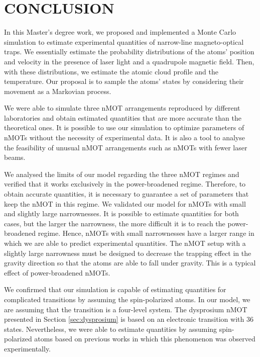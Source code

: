 %
\chapter{CONCLUSION}
\label{ch:conclusion}
%

In this Master's degree work, we proposed and implemented a Monte Carlo simulation to estimate experimental quantities of narrow-line magneto-optical traps. We essentially estimate the probability distributions of the atoms' position and velocity in the presence of laser light and a quadrupole magnetic field. Then, with these distributions, we estimate the atomic cloud profile and the temperature. Our proposal is to sample the atoms' states by considering their movement as a Markovian process.

We were able to simulate three nMOT arrangements reproduced by different laboratories and obtain estimated quantities that are more accurate than the theoretical ones. It is possible to use our simulation to optimize parameters of nMOTs without the necessity of experimental data. It is also a tool to analyse the feasibility of unusual nMOT arrangements such as nMOTs with fewer laser beams.

We analysed the limits of our model regarding the three nMOT regimes and verified that it works exclusively in the power-broadened regime. Therefore, to obtain accurate quantities, it is necessary to guarantee a set of parameters that keep the nMOT in this regime. We validated our model for nMOTs with small and slightly large narrownesses. It is possible to estimate quantities for both cases, but the larger the narrowness, the more difficult it is to reach the power-broadened regime. Hence, nMOTs with small narrownesses have a larger range in which we are able to predict experimental quantities. The nMOT setup with a slightly large narrowness must be designed to decrease the trapping effect in the gravity direction so that the atoms are able to fall under gravity. This is a typical effect of power-broadened nMOTs.

We confirmed that our simulation is capable of estimating quantities for complicated transitions by assuming the spin-polarized atoms. In our model, we are assuming that the transition is a four-level system. The dysprosium nMOT presented in Section \ref{sec:dysprosium} is based on an electronic transition with 36 states. Nevertheless, we were able to estimate quantities by assuming spin-polarized atoms based on previous works in which this phenomenon was observed experimentally.


